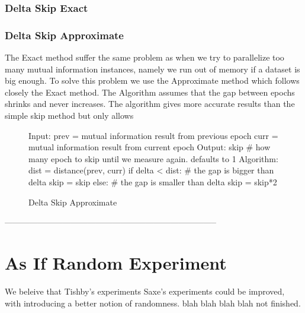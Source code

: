 \subsubsection{Delta Skip Exact}
\subsubsection{Delta Skip Approximate}

  The Exact method suffer the same problem as when we try to parallelize too
  many mutual information instances, namely we run out of memory if a dataset is
  big enough. To solve this problem we use the Approximate method which follows
  closely the Exact method. The Algorithm assumes that the gap between epochs
  shrinks and never increases. The algorithm gives more accurate results than
  the simple skip method but only allows 

\begin{figure}[h]
    \begin{pythonfigure}
      Input:
      prev = mutual information result from previous epoch
      curr = mutual information result from current epoch
      Output:
      skip # how many epoch to skip until we measure again. defaults to 1
      Algorithm:
      dist = distance(prev, curr)
      if delta < dist: # the gap is bigger than delta
        skip = skip
      else: # the gap is smaller than delta
        skip = skip*2
    \end{pythonfigure}
    \caption{Delta Skip Approximate}
    \label{fig:deltaapprox}
\end{figure}

-----------------------------------------------------------------------------

\section{As If Random Experiment}

We beleive that Tishby's experiments Saxe's experiments could be improved, with
introducing a better notion of randomness. blah blah blah blah not finished.

